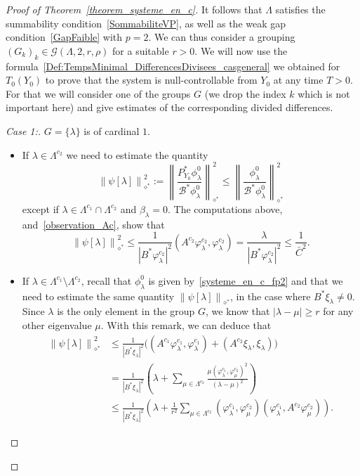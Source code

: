 \documentclass[AHL,Unicode,longabstracts]{cedram}
\newenvironment{step}[1]{\begin{proof}[#1]}{\let\qed\relax\end{proof}}
\newcommand{\fprop}[2]{\varphi^{#1}_{#2}}
\newcommand\Bs{\mathcal{B}^*}
\newcommand{\Fzp}{Y_0}
\newcommand{\normeXalphas}[1]{\left\| #1 \right\|_{\diamond^*}}
\newcommand{\PFa}{P_{\Fzp}^*}
\begin{document}
\begin{proof}[Proof of Theorem~\ref{theorem_systeme_en_c}]
It follows that $\Lambda$ satisfies the summability condition~\eqref{SommabiliteVP}, as well as the weak gap condition~\eqref{GapFaible} with $p=2$. We can thus consider a grouping $(G_k)_k\in \mathcal{G}(\Lambda,2,r,\rho)$ for a suitable $r>0$. We will now use the formula~\eqref{Def:TempsMinimal_DifferencesDivisees_casgeneral} we obtained for $T_0(\Fzp)$ to prove that the system is null-controllable from $\Fzp$ at any time $T>0$. For that we will consider one of the groups $G$ (we drop the index $k$ which is not important here) and give estimates of the corresponding divided differences.
\begin{step}{Case 1:} $G=\{\lambda\}$ is of cardinal $1$.
\begin{itemize}
\item If $\lambda\in \Lambda^{c_2}$ we need to estimate the quantity
\[
\normeXalphas{\psi[\lambda]}^2:=\normeXalphas{\frac{\PFa \phi_\lambda^0}{\Bs \phi_\lambda^0}}^2\leq \normeXalphas{\frac{\phi_\lambda^0}{\Bs \phi_\lambda^0}}^2
\]
except if $\lambda\in \Lambda^{c_1}\cap \Lambda^{c_2}$ and $\beta_\lambda=0$. The computations above, and~\eqref{observation_Ac}, show that
\[
\normeXalphas{\psi[\lambda]}^2\leq \frac{1}{|B^* \fprop{c_2}{\lambda}|^2} (A^{c_2} \fprop{c_2}{\lambda},\fprop{c_2}{\lambda}) = \frac{\lambda}{|B^* \fprop{c_2}{\lambda}|^2} \leq \frac{1}{\bar{C}^2}.
\]
\item If $\lambda\in \Lambda^{c_1}\setminus \Lambda^{c_2}$, recall that $\phi_\lambda^0$ is given by~\eqref{systeme_en_c_fp2} and that we need to estimate the same quantity $\normeXalphas{\psi[\lambda]}$, in the case where $B^*\xi_\lambda\neq 0$. Since $\lambda$ is the only element in the group $G$, we know that $|\lambda-\mu|\geq r$ for any other eigenvalue $\mu$. With this remark, we can deduce that
\begin{align*}
\normeXalphas{\psi[\lambda]}^2 & \leq \frac{1}{|B^* \xi_\lambda|^2} \big((A^{c_1}\fprop{c_1}{\lambda},\fprop{c_1}{\lambda}) + (A^{c_2} \xi_\lambda,\xi_\lambda) \big)\\
& = \frac{1}{|B^* \xi_\lambda|^2} \left(\lambda + \sum_{\mu\in \Lambda^{c_2}} \frac{\mu(\fprop{c_1}{\lambda},\fprop{c_2}{\mu})^2}{(\lambda-\mu)^2} \right) \\
& \leq \frac{1}{|B^* \xi_\lambda|^2} \left(\lambda + \frac{1}{r^2}\sum_{\mu\in \Lambda^{c_2}} (\fprop{c_1}{\lambda},\fprop{c_2}{\mu}) (\fprop{c_1}{\lambda},A^{c_2} \fprop{c_2}{\mu}) \right).
\end{align*}



\end{itemize}
\end{step}
\end{proof}
\end{document}
